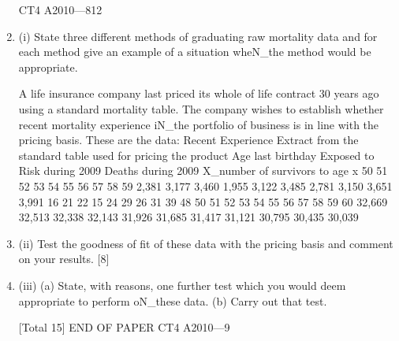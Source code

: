 \documentclass[a4paper,12pt]{article}
\begin{document}
\begin{enumerate}
CT4 A2010—812
\item (i)
State three different methods of graduating raw mortality data and for each method give an example of a situation wheN_the method would be
appropriate.
 
A life insurance company last priced its whole of life contract 30 years ago using a
standard mortality table. The company wishes to establish whether recent mortality experience iN_the portfolio of business is in line with the pricing basis. These are the
data:
Recent Experience
Extract from the standard table
used for pricing the product
Age last
birthday Exposed to
Risk during
2009 Deaths during
2009 X_number of
survivors to age
x
50
51
52
53
54
55
56
57
58
59 2,381
3,177
3,460
1,955
3,122
3,485
2,781
3,150
3,651
3,991 16
21
22
15
24
29
26
31
39
48 50
51
52
53
54
55
56
57
58
59
60 32,669
32,513
32,338
32,143
31,926
31,685
31,417
31,121
30,795
30,435
30,039
\item (ii) Test the goodness of fit of these data with the pricing basis and comment on
your results.
[8]
\item (iii) (a)
State, with reasons, one further test which you would deem appropriate
to perform oN_these data.
(b)
Carry out that test.

[Total 15]
END OF PAPER
CT4 A2010—9


\end{enumerate}
\end{document}
